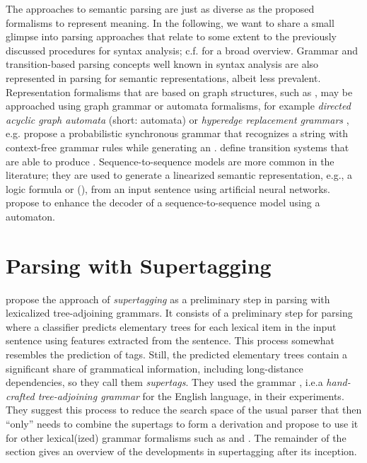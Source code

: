 \documentclass[../document.tex]{subfiles}
\begin{document}
    The approaches to semantic parsing are just as diverse as the proposed formalisms to represent meaning.
    In the following, we  want to share a small glimpse into parsing approaches that relate to some extent to the previously discussed procedures for syntax analysis; c.f.\@ \citet{kamath2018survey} for a broad overview.
    Grammar and transition-based parsing concepts well known in syntax analysis are also represented in parsing for semantic representations, albeit less prevalent.
    Representation formalisms that are based on graph structures, such as , may be approached using graph grammar or automata formalisms, for example \emph{directed acyclic graph automata} (short:  automata) \citep{fancellu-etal-2019-semantic} or \emph{hyperedge replacement grammars} \citep{drewes1997hyperedge}, e.g.\@ \citet{peng2015synchronous} propose a probabilistic synchronous grammar that recognizes a string with context-free grammar rules while generating an .
    \citet{peng2018amr,vilares-gomez-rodriguez-2018-transition} define transition systems that are able to produce .
    Sequence-to-sequence models are more common in the literature; they are used to generate a linearized semantic representation, e.g.\@, a logic formula \citep{dong-lapata-2016-language} or  (\citep{zhang-etal-2019-amr}), from an input sentence using artificial neural networks.
    \citet{fancellu-etal-2019-semantic} propose to enhance the decoder of a sequence-to-sequence model using a  automaton.

    \section{Parsing with Supertagging}\label{sec:literature:supertagging}
    \citet{bangalore1999supertagging} propose the approach of \emph{supertagging} as a preliminary step in parsing with lexicalized tree-adjoining grammars.
    It consists of a preliminary step for parsing where a classifier predicts elementary trees for each lexical item in the input sentence using features extracted from the sentence.
    This process somewhat resembles the prediction of  tags. Still, the predicted elementary trees contain a significant share of grammatical information, including long-distance dependencies, so they call them \emph{supertags}.
    They used the  grammar \citep{xtag01}, i.e.\@ a \emph{hand-crafted tree-adjoining grammar} for the English language, in their experiments. 
    They suggest this process to reduce the search space of the usual parser that then ``only'' needs to combine the supertags to form a derivation and propose to use it for other lexical(ized) grammar formalisms such as  and .
    The remainder of the section gives an overview of the developments in supertagging after its inception.
\end{document}
